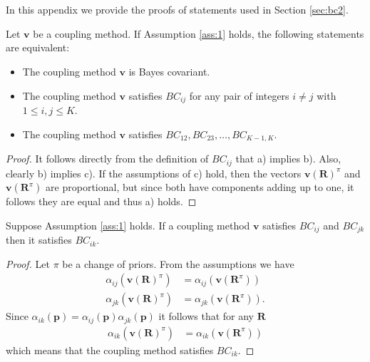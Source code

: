 \appendix

\section{}
\label{app:bc1}

In this appendix we provide the proofs of statements used in Section \ref{sec:bc2}.

\begin{prop} \label{prop:bcprop}
	Let $\boldsymbol{v}$ be a coupling method. If Assumption \ref{ass:1} holds, the following statements are equivalent:
	\begin{itemize}
		\item[a)] The coupling method $\boldsymbol{v}$ is Bayes covariant.
		\item[b)] The coupling method $\boldsymbol{v}$ satisfies $BC_{ij}$ for any pair of integers  $i\not= j$ with $1\leq i,j \leq K$.
		\item[c)] The coupling method $\boldsymbol{v}$ satisfies $BC_{12}, BC_{23}, \ldots, BC_{K-1,K}$.
	\end{itemize}
\end{prop}
\begin{proof}
It follows directly from the definition of $BC_{ij}$ that a) implies b). Also, clearly b) implies c). If the assumptions of c) hold, then the vectors $\boldsymbol{v}(\boldsymbol{R})^\pi$ and $ \boldsymbol{v}(\boldsymbol{R}^\pi)$ are proportional, but since both have components adding up to one, it follows they are equal and thus a) holds.
\end{proof}

\begin{lem} \label{lem:transitivity}
	Suppose Assumption \ref{ass:1} holds. If a coupling method $\boldsymbol{v}$ satisfies $BC_{ij}$ and $BC_{jk}$ then it satisfies $BC_{ik}$.
\end{lem}
\begin{proof}
	Let $\pi$ be a change of priors. From the assumptions we have 
	\begin{align}
		\alpha_{ij}(\boldsymbol{v}(\boldsymbol{R})^\pi ) &= \alpha_{ij}(\boldsymbol{v}(\boldsymbol{R}^\pi) ) \\
		\alpha_{jk}(\boldsymbol{v}(\boldsymbol{R})^\pi ) &= \alpha_{jk}(\boldsymbol{v}(\boldsymbol{R}^\pi) ).
	\end{align}
	Since $\alpha_{ik}(\boldsymbol{p}) = \alpha_{ij}(\boldsymbol{p})  \alpha_{jk}(\boldsymbol{p})$ it follows that for any $\boldsymbol{R}$
	\begin{align}
		\alpha_{ik}(\boldsymbol{v}(\boldsymbol{R})^\pi ) &= \alpha_{ik}(\boldsymbol{v}(\boldsymbol{R}^\pi) )
	\end{align}
	which means that the coupling method satisfies $BC_{ik}$.
\end{proof}

